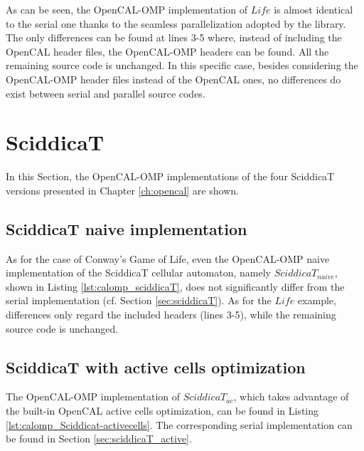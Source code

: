 

As can be seen, the OpenCAL-OMP implementation of $Life$ is almost
identical to the serial one thanks to the seamless parallelization
adopted by the library. The only differences can be found at lines 3-5
where, instead of including the OpenCAL header files, the OpenCAL-OMP
headers can be found. All the remaining source code is unchanged. In
this specific case, besides considering the OpenCAL-OMP header files
instead of the OpenCAL ones, no differences do exist between serial
and parallel source codes.


\section{SciddicaT}

In this Section, the OpenCAL-OMP implementations of the four SciddicaT
versions presented in Chapter \ref{ch:opencal} are shown.

\subsection{SciddicaT naive implementation}

As for the case of Conway's Game of Life, even the OpenCAL-OMP naive
implementation of the SciddicaT cellular automaton, namely
$SciddicaT_{naive}$, shown in Listing \ref{lst:calomp_sciddicaT}, does
not significantly differ from the serial implementation (cf. Section
\ref{sec:sciddicaT}). As for the $Life$ example, differences only
regard the included headers (lines 3-5), while the remaining source
code is unchanged.



\subsection{SciddicaT with active cells optimization}
The OpenCAL-OMP implementation of $SciddicaT_{ac}$, which takes
advantage of the built-in OpenCAL active cells optimization, can be
found in Listing \ref{lst:calomp_Sciddicat-activecells}. The
corresponding serial implementation can be found in Section
\ref{sec:sciddicaT_active}.

